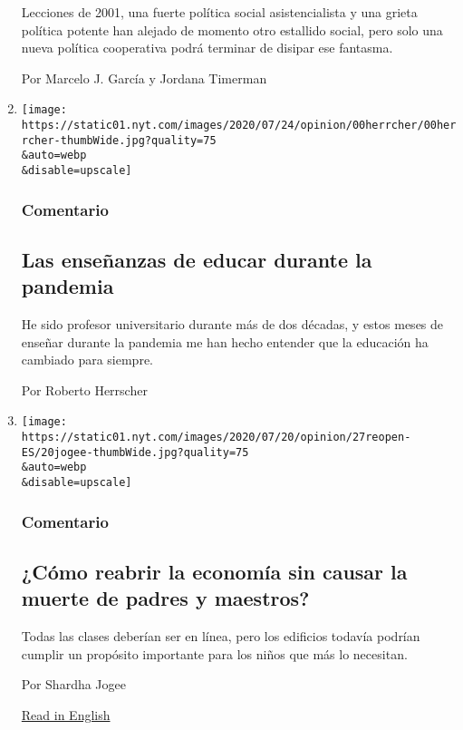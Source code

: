 \begin{enumerate}
  Lecciones de 2001, una fuerte política social asistencialista y una
  grieta política potente han alejado de momento otro estallido social,
  pero solo una nueva política cooperativa podrá terminar de disipar ese
  fantasma.

  Por Marcelo J. García y Jordana Timerman
\item
  \href{/es/2020/07/27/espanol/opinion/clases-universidad-coronavirus.html}{}

  \texttt{[image: https://static01.nyt.com/images/2020/07/24/opinion/00herrcher/00herrcher-thumbWide.jpg?quality=75\\\&auto=webp\\\&disable=upscale]}

  \hypertarget{comentario-11}{%
  \subsubsection{Comentario}\label{comentario-11}}

  \hypertarget{las-enseuxf1anzas-de-educar-durante-la-pandemia}{%
  \subsection{Las enseñanzas de educar durante la
  pandemia}\label{las-enseuxf1anzas-de-educar-durante-la-pandemia}}

  He sido profesor universitario durante más de dos décadas, y estos
  meses de enseñar durante la pandemia me han hecho entender que la
  educación ha cambiado para siempre.

  Por Roberto Herrscher
\item
  \href{/es/2020/07/27/espanol/opinion/reabrir-escuelas-riesgo-covid.html}{}

  \texttt{[image: https://static01.nyt.com/images/2020/07/20/opinion/27reopen-ES/20jogee-thumbWide.jpg?quality=75\\\&auto=webp\\\&disable=upscale]}

  \hypertarget{comentario-12}{%
  \subsubsection{Comentario}\label{comentario-12}}

  \hypertarget{cuxf3mo-reabrir-la-economuxeda-sin-causar-la-muerte-de-padres-y-maestros}{%
  \subsection{¿Cómo reabrir la economía sin causar la muerte de padres y
  maestros?}\label{cuxf3mo-reabrir-la-economuxeda-sin-causar-la-muerte-de-padres-y-maestros}}

  Todas las clases deberían ser en línea, pero los edificios todavía
  podrían cumplir un propósito importante para los niños que más lo
  necesitan.

  Por Shardha Jogee

  \href{https://www.nytimes.com/2020/07/20/opinion/coronavirus-reopen-schools-economy.html}{Read
  in English}
\end{enumerate}

